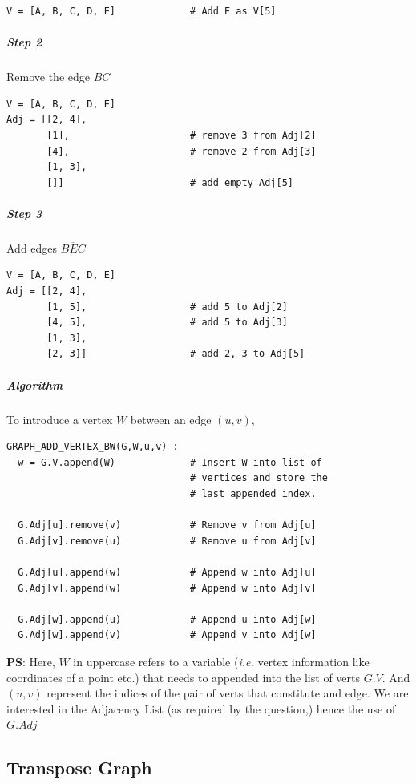 \documentclass[11pt]{article}
\begin{document}
\begin{verbatim}
V = [A, B, C, D, E]             # Add E as V[5]
\end{verbatim}

\subparagraph*{Step 2}
\label{sec:orge6753e5}
Remove the edge  \(\overline{\mathit{BC}}\)
\begin{verbatim}
V = [A, B, C, D, E]
Adj = [[2, 4],
       [1],                     # remove 3 from Adj[2]
       [4],                     # remove 2 from Adj[3]
       [1, 3],
       []]                      # add empty Adj[5]
\end{verbatim}

\subparagraph*{Step 3}
\label{sec:org9682198}
Add edges \(\overline{\mathit{BEC}}\)
\begin{verbatim}
V = [A, B, C, D, E]
Adj = [[2, 4],
       [1, 5],                  # add 5 to Adj[2]
       [4, 5],                  # add 5 to Adj[3]
       [1, 3],
       [2, 3]]                  # add 2, 3 to Adj[5]
\end{verbatim}

\subparagraph*{Algorithm}
\label{sec:org5efff81}

To introduce a vertex \(W\) between an edge \((u,v)\),

\begin{verbatim}
GRAPH_ADD_VERTEX_BW(G,W,u,v) :
  w = G.V.append(W)             # Insert W into list of
                                # vertices and store the
                                # last appended index.

  G.Adj[u].remove(v)            # Remove v from Adj[u]
  G.Adj[v].remove(u)            # Remove u from Adj[v]

  G.Adj[u].append(w)            # Append w into Adj[u]
  G.Adj[v].append(w)            # Append w into Adj[v]

  G.Adj[w].append(u)            # Append u into Adj[w]
  G.Adj[w].append(v)            # Append v into Adj[w]
\end{verbatim}

\textbf{PS}: Here, \(W\) in uppercase refers to a variable
(\emph{i.e.} vertex information like coordinates of a point
etc.) that needs to appended into the list of verts
\(G.V\). And \((u,v)\) represent the indices of the pair of
verts that constitute and edge.  We are interested in
the Adjacency List (as required by the question,) hence
the use of \(G.Adj\)

\subsection{Transpose Graph}
\label{sec:orgd582205}
\end{document}
